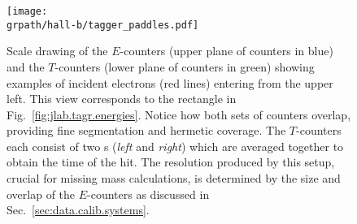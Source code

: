\begin{figure}\begin{center}
\texttt{[image: \\grpath/hall-b/tagger\_paddles.pdf]}
\caption[Tagger Schematic - Paddles]{\label{fig:jlab.tagr.paddles}{}Scale drawing of the $E$-counters (upper plane of counters in blue) and the $T$-counters (lower plane of counters in green) showing examples of incident electrons (red lines) entering from the upper left. This view corresponds to the rectangle in Fig.~\ref{fig:jlab.tagr.energies}. Notice how both sets of counters overlap, providing fine segmentation and hermetic coverage. The $T$-counters each consist of two s (\emph{left} and \emph{right}) which are averaged together to obtain the time of the hit. The resolution produced by this setup, crucial for missing mass calculations, is determined by the size and overlap of the $E$-counters as discussed in Sec.~\ref{sec:data.calib.systems}.}
\end{center}\end{figure}
